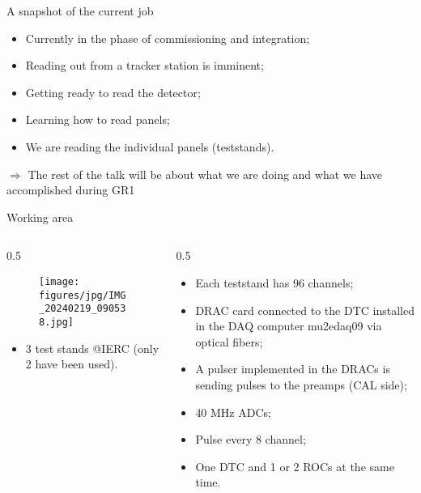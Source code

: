 \documentclass{beamer}[10pt]
\begin{document}
\begin{frame}{A snapshot of the current job}
\vspace{-3mm}
\begin{itemize}
\item Currently in the phase of commissioning and integration;
\vspace{3mm}
\item Reading out from a tracker station is imminent;
\vspace{3mm}
\item Getting ready to read the detector;
\vspace{3mm}
\item Learning how to read panels;
\vspace{3mm}
\item We are reading the individual panels (teststands).
\vspace{5mm}
\end{itemize}
$\Rightarrow$ The rest of the talk will be about what we are doing and what we have accomplished during GR1
\end{frame}
\begin{frame}{Working area}
    \begin{columns}
        \begin{column}{0.5\framewidth}
            \begin{figure}[H]
                \centering
                \texttt{[image: figures/jpg/IMG\_20240219\_090538.jpg]}
                \label{fig:enter-label}
            \end{figure}
\vspace{2mm}
            \begin{itemize}
            \item 3 test stands @IERC (only 2 have been used).
            \end{itemize}
        \end{column}
        \begin{column}{0.5\framewidth}
            \begin{itemize}
          \item Each teststand has 96 channels;  
\vspace{2mm}
           \item DRAC card connected to the DTC installed in the DAQ computer mu2edaq09 via optical fibers; 
\vspace{2mm}
            \item A pulser implemented in the DRACs is sending pulses to the preamps (CAL side);
\vspace{2mm}
            \item  40 MHz ADCs;
\vspace{2mm}
            \item Pulse every 8 channel;
\vspace{2mm}
 \item One DTC and 1 or 2 ROCs at the same time.
            \end{itemize}
        \end{column}
    \end{columns}
    \vspace{5mm}
\end{frame}
\end{document}

